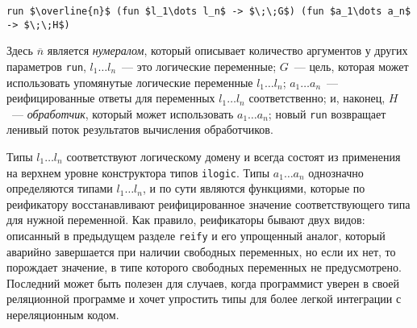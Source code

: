 \begin{lstlisting}[mathescape=true]
   run $\overline{n}$ (fun $l_1\dots l_n$ -> $\;\;G$) (fun $a_1\dots a_n$ -> $\;\;H$)
\end{lstlisting}
\noindent Здесь $\overline{n}$ является \emph{нумералом}, который описывает количество аргументов у других параметров \lstinline|run|,
\mbox{$l_1\dots l_n$}~--- это логические переменные;
$G$~--- цель, которая может использовать упомянутые логические переменные \mbox{$l_1\dots l_n$};
\mbox{$a_1\dots a_n$}~---  реифицированные ответы для переменных \mbox{$l_1\dots l_n$} соответственно; и,
наконец, $H$~--- \emph{обработчик}, который может использовать \mbox{$a_1\dots a_n$};
новый \lstinline|run| возвращает ленивый поток результатов вычисления обработчиков.



Типы \mbox{$l_1\dots l_n$} соответствуют логическому домену и всегда состоят из применения на верхнем уровне конструктора типов \lstinline|ilogic|.
%
%
Типы \mbox{$a_1\dots a_n$} однозначно определяются типами \mbox{$l_1\dots l_n$}, и по сути являются функциями, которые по реификатору восстанавливают реифицированное значение соответствующего типа для нужной переменной.
Как правило, реификаторы бывают двух видов: описанный в предыдущем разделе \lstinline|reify| и его упрощенный аналог, который аварийно завершается при наличии свободных переменных, но если их нет, то порождает значение, в типе которого свободных переменных не предусмотрено.
Последний может быть полезен для случаев, когда программист уверен в своей реляционной программе и хочет упростить типы для более легкой интеграции с нереляционным кодом.

